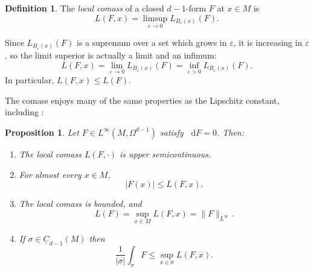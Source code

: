 \documentclass[reqno,11pt]{amsart}
\newcommand*\dif{\mathop{}\!\mathrm{d}}
\newcommand{\Chain}{\underline C}
\newcommand{\dfn}[1]{\emph{#1}\index{#1}}
\newtheorem{proposition}[theorem]{Proposition}
\theoremstyle{definition}
\newtheorem{definition}[theorem]{Definition}
\numberwithin{equation}{section}
\begin{document}
\begin{definition}
The \dfn{local comass} of a closed $d - 1$-form $F$ at $x \in M$ is 
$$L(F, x) = \limsup_{\varepsilon \to 0} L_{B_\varepsilon(x)}(F).$$
\end{definition}

Since $L_{B_\varepsilon(x)}(F)$ is a supremum over a set which grows in $\varepsilon$, it is increasing in $\varepsilon$, so the limit superior is actually a limit and an infimum:
$$L(F, x) = \lim_{\varepsilon \to 0} L_{B_\varepsilon(x)}(F) = \inf_{\varepsilon > 0} L_{B_\varepsilon(x)}(F).$$
In particular, $L(F, x) \leq L(F)$.

The comass enjoys many of the same properties as the Lipschitz constant, including \cite[Lemma 4.3]{Crandall2008}:

\begin{proposition}\label{crandall}
Let $F \in L^\infty(M, \Omega^{d - 1})$ satisfy $\dif F = 0$. Then:
\begin{enumerate}
\item The local comass $L(F, \cdot)$ is upper semicontinuous. \label{crandall usc}
\item For almost every $x \in M$,
$$|F(x)| \leq L(F, x).$$
\label{crandall LDT}
\item The local comass is bounded, and \label{crandall linfinity}
$$L(F) = \sup_{x \in M} L(F, x) = \|F\|_{L^\infty}.$$
\item If $\sigma \in \Chain_{d - 1}(M)$ then \label{crandall best curl is ABC}
$$\frac{1}{|\sigma|} \int_\sigma F \leq \sup_{x \in \sigma} L(F, x).$$
\end{enumerate}
\end{proposition}
\end{document}
